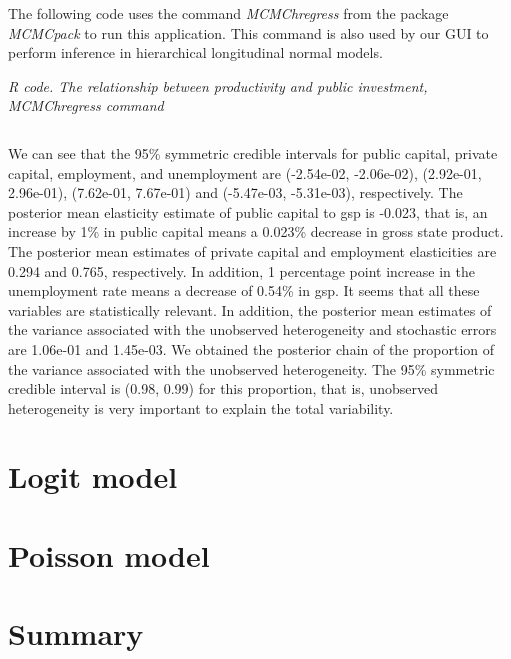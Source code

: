 The following code uses the command \textit{MCMChregress} from the package \textit{MCMCpack} to run this application. This command is also used by our GUI to perform inference in hierarchical longitudinal normal models.

\begin{tcolorbox}[enhanced,width=4.67in,center upper,
	fontupper=\large\bfseries,drop shadow southwest,sharp corners]
	\textit{R code. The relationship between productivity and public investment, MCMChregress command}
	\begin{VF}
		\begin{lstlisting}[language=R]

		\end{lstlisting}
	\end{VF}
\end{tcolorbox}

We can see that the 95\% symmetric credible intervals for public capital, private capital, employment, and unemployment are (-2.54e-02, -2.06e-02), (2.92e-01, 2.96e-01), (7.62e-01, 7.67e-01) and (-5.47e-03, -5.31e-03), respectively. The posterior mean elasticity estimate of public capital to gsp is -0.023, that is, an increase by 1\% in public capital means a 0.023\% decrease in gross state product. The posterior mean estimates of private capital and employment elasticities are 0.294 and 0.765, respectively. In addition, 1 percentage point increase in the unemployment rate means a decrease of 0.54\% in gsp. It seems that all these variables are statistically relevant. In addition, the posterior mean estimates of the variance associated with the unobserved heterogeneity and stochastic errors are 1.06e-01 and 1.45e-03. We obtained the posterior chain of the proportion of the variance associated with the unobserved heterogeneity. The 95\% symmetric credible interval is (0.98, 0.99) for this proportion, that is, unobserved heterogeneity is very important to explain the total variability.


\section{Logit model}\label{sec92}

\section{Poisson model}\label{sec93}

\section{Summary}\label{sec94}

